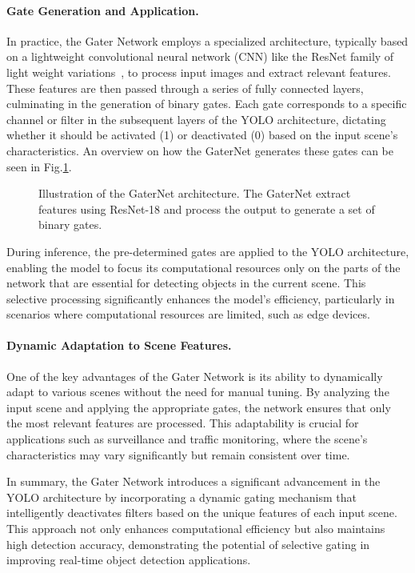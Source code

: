 \paragraph{Gate Generation and Application.} In practice, the Gater Network employs a specialized architecture, typically based on a lightweight convolutional neural network (CNN) like the ResNet family of light weight variations~\cite{he2016deep}, to process input images and extract relevant features. These features are then passed through a series of fully connected layers, culminating in the generation of binary gates. Each gate corresponds to a specific channel or filter in the subsequent layers of the YOLO architecture, dictating whether it should be activated (1) or deactivated (0) based on the input scene's characteristics. An overview on how the GaterNet generates these gates can be seen in Fig.\ref{fig:gaternet_architecture}.

\begin{figure}[ht]
    \centering
    
    \caption{Illustration of the GaterNet architecture. The GaterNet extract features using ResNet-18 and process the output to generate a set of binary gates.}
    \label{fig:gaternet_architecture}
    \end{figure}

During inference, the pre-determined gates are applied to the YOLO architecture, enabling the model to focus its computational resources only on the parts of the network that are essential for detecting objects in the current scene. This selective processing significantly enhances the model's efficiency, particularly in scenarios where computational resources are limited, such as edge devices.

\paragraph{Dynamic Adaptation to Scene Features.} One of the key advantages of the Gater Network is its ability to dynamically adapt to various scenes without the need for manual tuning. By analyzing the input scene and applying the appropriate gates, the network ensures that only the most relevant features are processed. This adaptability is crucial for applications such as surveillance and traffic monitoring, where the scene's characteristics may vary significantly but remain consistent over time.

In summary, the Gater Network introduces a significant advancement in the YOLO architecture by incorporating a dynamic gating mechanism that intelligently deactivates filters based on the unique features of each input scene. This approach not only enhances computational efficiency but also maintains high detection accuracy, demonstrating the potential of selective gating in improving real-time object detection applications.

